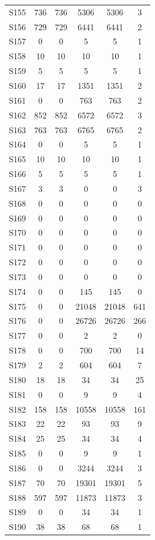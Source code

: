 {\begin{longtable}{l S[table-format=9.0] S[table-format=9.0] S[table-format=9.0] S[table-format=9.0] S[table-format=9.0]}
S155 & 736 & 736 & 5306 & 5306 & 3 \\
S156 & 729 & 729 & 6441 & 6441 & 2 \\
S157 & 0 & 0 & 5 & 5 & 1 \\
S158 & 10 & 10 & 10 & 10 & 1 \\
S159 & 5 & 5 & 5 & 5 & 1 \\
S160 & 17 & 17 & 1351 & 1351 & 2 \\
S161 & 0 & 0 & 763 & 763 & 2 \\
S162 & 852 & 852 & 6572 & 6572 & 3 \\
S163 & 763 & 763 & 6765 & 6765 & 2 \\
S164 & 0 & 0 & 5 & 5 & 1 \\
S165 & 10 & 10 & 10 & 10 & 1 \\
S166 & 5 & 5 & 5 & 5 & 1 \\
S167 & 3 & 3 & 0 & 0 & 3 \\
S168 & 0 & 0 & 0 & 0 & 0 \\
S169 & 0 & 0 & 0 & 0 & 0 \\
S170 & 0 & 0 & 0 & 0 & 0 \\
S171 & 0 & 0 & 0 & 0 & 0 \\
S172 & 0 & 0 & 0 & 0 & 0 \\
S173 & 0 & 0 & 0 & 0 & 0 \\
S174 & 0 & 0 & 145 & 145 & 0 \\
S175 & 0 & 0 & 21048 & 21048 & 641 \\
S176 & 0 & 0 & 26726 & 26726 & 266 \\
S177 & 0 & 0 & 2 & 2 & 0 \\
S178 & 0 & 0 & 700 & 700 & 14 \\
S179 & 2 & 2 & 604 & 604 & 7 \\
S180 & 18 & 18 & 34 & 34 & 25 \\
S181 & 0 & 0 & 9 & 9 & 4 \\
S182 & 158 & 158 & 10558 & 10558 & 161 \\
S183 & 22 & 22 & 93 & 93 & 9 \\
S184 & 25 & 25 & 34 & 34 & 4 \\
S185 & 0 & 0 & 9 & 9 & 1 \\
S186 & 0 & 0 & 3244 & 3244 & 3 \\
S187 & 70 & 70 & 19301 & 19301 & 5 \\
S188 & 597 & 597 & 11873 & 11873 & 3 \\
S189 & 0 & 0 & 34 & 34 & 1 \\
S190 & 38 & 38 & 68 & 68 & 1 \\

\end{longtable}}
